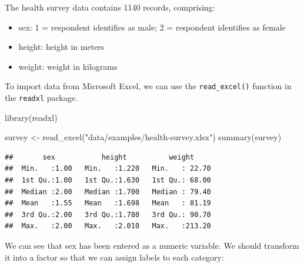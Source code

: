 \documentclass[
]{memoir}
\newenvironment{Shaded}{\begin{snugshade}}{\end{snugshade}}
\newcommand{\AttributeTok}[1]{\textcolor[rgb]{0.77,0.63,0.00}{#1}}
\newcommand{\DecValTok}[1]{\textcolor[rgb]{0.00,0.00,0.81}{#1}}
\newcommand{\FunctionTok}[1]{\textcolor[rgb]{0.00,0.00,0.00}{#1}}
\newcommand{\NormalTok}[1]{#1}
\newcommand{\OtherTok}[1]{\textcolor[rgb]{0.56,0.35,0.01}{#1}}
\newcommand{\SpecialCharTok}[1]{\textcolor[rgb]{0.00,0.00,0.00}{#1}}
\newcommand{\StringTok}[1]{\textcolor[rgb]{0.31,0.60,0.02}{#1}}
\providecommand{\tightlist}{%
  \setlength{\itemsep}{0pt}\setlength{\parskip}{0pt}}
\begin{document}
The health survey data contains 1140 records, comprising:

\begin{itemize}
\tightlist
\item
  sex: 1 = respondent identifies as male; 2 = respondent identifies as female
\item
  height: height in meters
\item
  weight: weight in kilograms
\end{itemize}

To import data from Microsoft Excel, we can use the \texttt{read\_excel()} function in the \texttt{readxl} package.

\begin{Shaded}
\begin{Highlighting}[]
\FunctionTok{library}\NormalTok{(readxl)}

\NormalTok{survey }\OtherTok{\textless{}{-}} \FunctionTok{read\_excel}\NormalTok{(}\StringTok{"data/examples/health{-}survey.xlsx"}\NormalTok{)}
\FunctionTok{summary}\NormalTok{(survey)}
\end{Highlighting}
\end{Shaded}

\begin{verbatim}
##       sex           height          weight      
##  Min.   :1.00   Min.   :1.220   Min.   : 22.70  
##  1st Qu.:1.00   1st Qu.:1.630   1st Qu.: 68.00  
##  Median :2.00   Median :1.700   Median : 79.40  
##  Mean   :1.55   Mean   :1.698   Mean   : 81.19  
##  3rd Qu.:2.00   3rd Qu.:1.780   3rd Qu.: 90.70  
##  Max.   :2.00   Max.   :2.010   Max.   :213.20
\end{verbatim}

We can see that sex has been entered as a numeric variable. We should transform it into a factor so that we can assign labels to each category:

\begin{Shaded}
\end{Shaded}
\end{document}
